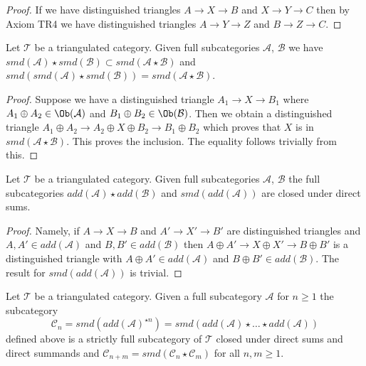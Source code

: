 \begin{proof}
If we have distinguished triangles $A \to X \to B$ and $X \to Y \to C$
then by Axiom TR4 we have distinguished triangles
$A \to Y \to Z$ and $B \to Z \to C$.
\end{proof}

\begin{lemma}
\label{lemma-smd-star}
Let $\mathcal{T}$ be a triangulated category.
Given full subcategories $\mathcal{A}$, $\mathcal{B}$
we have
$smd(\mathcal{A}) \star smd(\mathcal{B}) \subset
smd(\mathcal{A} \star \mathcal{B})$ and
$smd(smd(\mathcal{A}) \star smd(\mathcal{B})) =
smd(\mathcal{A} \star \mathcal{B})$.
\end{lemma}

\begin{proof}
Suppose we have a distinguished triangle $A_1 \to X \to B_1$ where
$A_1 \oplus A_2 \in \Ob(\mathcal{A})$ and $B_1 \oplus B_2 \in \Ob(\mathcal{B})$.
Then we obtain a distinguished triangle
$A_1 \oplus A_2 \to A_2 \oplus X \oplus B_2 \to B_1 \oplus B_2$
which proves that $X$ is in $smd(\mathcal{A} \star \mathcal{B})$.
This proves the inclusion. The equality follows trivially from this.
\end{proof}

\begin{lemma}
\label{lemma-add-star}
Let $\mathcal{T}$ be a triangulated category. Given full subcategories
$\mathcal{A}$, $\mathcal{B}$ the full subcategories
$add(\mathcal{A}) \star add(\mathcal{B})$ and
$smd(add(\mathcal{A}))$ are closed under direct sums.
\end{lemma}

\begin{proof}
Namely, if $A \to X \to B$ and $A' \to X' \to B'$ are distinguished triangles
and $A, A' \in add(\mathcal{A})$ and $B, B' \in add(\mathcal{B})$ then
$A \oplus A' \to X \oplus X' \to B \oplus B'$ is a distinguished triangle
with $A \oplus A' \in add(\mathcal{A})$ and $B \oplus B' \in add(\mathcal{B})$.
The result for $smd(add(\mathcal{A}))$ is trivial.
\end{proof}

\begin{lemma}
\label{lemma-cone-n}
Let $\mathcal{T}$ be a triangulated category. Given a full subcategory
$\mathcal{A}$ for $n \geq 1$ the subcategory
$$
\mathcal{C}_n = smd(add(\mathcal{A})^{\star n}) =
smd(add(\mathcal{A}) \star \ldots \star add(\mathcal{A}))
$$
defined above is a strictly full subcategory of $\mathcal{T}$
closed under direct sums and direct summands and
$\mathcal{C}_{n + m} = smd(\mathcal{C}_n \star \mathcal{C}_m)$
for all $n, m \geq 1$.
\end{lemma}

